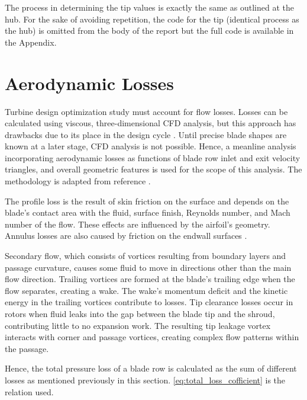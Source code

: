 \documentclass[12pt, letter]{report}
\begin{document}
The process in determining the tip values is exactly the same as outlined at the hub. For the sake of avoiding repetition, the code for the tip (identical process as the hub) is omitted from the body of the report but the full code is available in the Appendix. 




\section{Aerodynamic Losses}
Turbine design optimization study must account for flow losses. Losses can be calculated using viscous, three-dimensional CFD analysis, but this approach has drawbacks due to its place in the design cycle \cite{moustapha2003}. Until precise blade shapes are known at a later stage, CFD analysis is not possible. Hence, a meanline analysis incorporating aerodynamic losses as functions of blade row inlet and exit velocity triangles, and overall geometric features is used for the scope of this analysis. The methodology is adapted from reference \cite{moustapha2003}.\par

The profile loss is the result of skin friction on the surface and depends on the blade's contact area with the fluid, surface finish, Reynolds number, and Mach number of the flow. These effects are influenced by the airfoil's geometry. Annulus losses are also caused by friction on the endwall surfaces \cite{moustapha2003}. \par 

Secondary flow, which consists of vortices resulting from boundary layers and passage curvature, causes some fluid to move in directions other than the main flow direction. Trailing vortices are formed at the blade's trailing edge when the flow separates, creating a wake. The wake's momentum deficit and the kinetic energy in the trailing vortices contribute to losses. Tip clearance losses occur in rotors when fluid leaks into the gap between the blade tip and the shroud, contributing little to no expansion work. The resulting tip leakage vortex interacts with corner and passage vortices, creating complex flow patterns within the passage. \par

Hence, the total pressure loss of a blade row is calculated as the sum of different losses as mentioned previously in this section. \autoref{eq:total_loss_cofficient} is the relation used. \par
\end{document}
